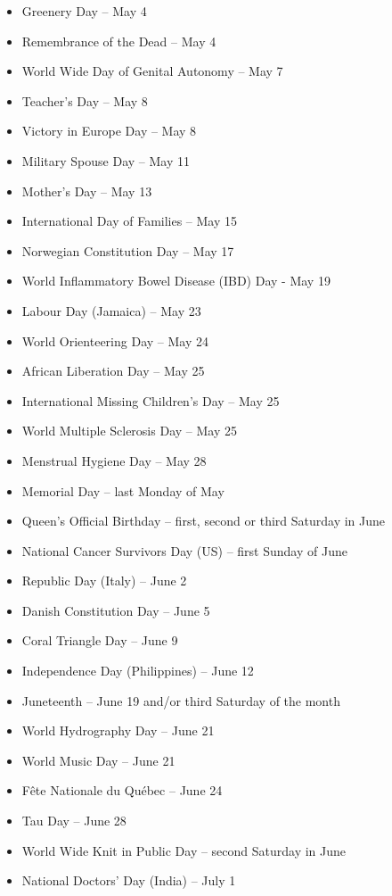 \documentclass[
]{book}
\begin{document}
\begin{itemize}
\item
  Greenery Day -- May 4
\item
  Remembrance of the Dead -- May 4
\item
  World Wide Day of Genital Autonomy -- May 7
\item
  Teacher's Day -- May 8
\item
  Victory in Europe Day -- May 8
\item
  Military Spouse Day -- May 11
\item
  Mother's Day -- May 13
\item
  International Day of Families -- May 15
\item
  Norwegian Constitution Day -- May 17
\item
  World Inflammatory Bowel Disease (IBD) Day - May 19
\item
  Labour Day (Jamaica) -- May 23
\item
  World Orienteering Day -- May 24
\item
  African Liberation Day -- May 25
\item
  International Missing Children's Day -- May 25
\item
  World Multiple Sclerosis Day -- May 25
\item
  Menstrual Hygiene Day -- May 28
\item
  Memorial Day -- last Monday of May
\item
  Queen's Official Birthday -- first, second or third Saturday in June
\item
  National Cancer Survivors Day (US) -- first Sunday of June
\item
  Republic Day (Italy) -- June 2
\item
  Danish Constitution Day -- June 5
\item
  Coral Triangle Day -- June 9
\item
  Independence Day (Philippines) -- June 12
\item
  Juneteenth -- June 19 and/or third Saturday of the month
\item
  World Hydrography Day -- June 21
\item
  World Music Day -- June 21
\item
  Fête Nationale du Québec -- June 24
\item
  Tau Day -- June 28
\item
  World Wide Knit in Public Day -- second Saturday in June
\item
  National Doctors' Day (India) -- July 1

\end{itemize}
\end{document}
